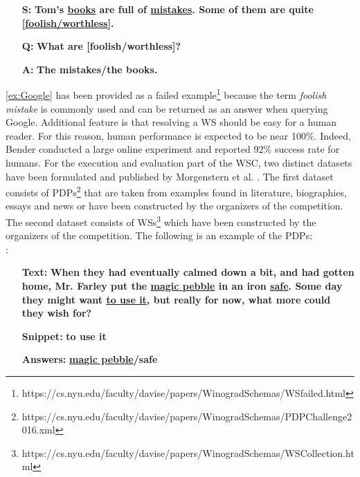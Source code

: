 \begin{itemize} 
	\item[\textbf{S:}] \textbf{Tom's \underline{books} are full of \underline{mistakes}. Some of them are quite \underline{[foolish/worthless]}.}
	\item[\textbf{Q:}] \textbf{What are [foolish/worthless]?}
	\item[\textbf{A:}] \textbf{The mistakes/the books.} 
\end{itemize} 


\ref{ex:Google} has been provided as a failed example\footnote{https://cs.nyu.edu/faculty/davise/papers/WinogradSchemas/WSfailed.html} because the term \textit{foolish mistake} is commonly used and can be returned as an answer when querying Google. Additional feature is that resolving a WS should be easy  for a human reader. For this reason, human performance is expected to be near 100\%. Indeed, Bender \cite{DBLP:conf/maics/Bender15} conducted a large online experiment and reported 92\% success rate for humans. 
For the execution and evaluation part of the WSC, two distinct datasets have been formulated and published by Morgenstern et al. \cite{DBLP:journals/aim/MorgensternDO16}.
The first dataset consists of PDPs\footnote{https://cs.nyu.edu/faculty/davise/papers/WinogradSchemas/PDPChallenge2016.xml} that are taken from examples found in literature, biographies, essays and news or have been constructed by the organizers of the competition. 
The second dataset consists of WSs\footnote{https://cs.nyu.edu/faculty/davise/papers/WinogradSchemas/WSCollection.html} which have been constructed by the organizers of the competition.
The following is an example of the PDPs:\\
:

\begin{itemize}[align=left] 
	\item [\textbf{Text:}] \textbf{When they had eventually calmed down a bit, and had gotten home, Mr. Farley put the \underline{magic pebble} in an iron \underline{safe}. Some day they might want \underline{to use it}, but really for now, what more could they wish for?}
	
	\item [\textbf{Snippet:}] \textbf{to use it}
	\item [\textbf{Answers:}] \textbf{\underline{magic pebble}/safe}

\end{itemize}

